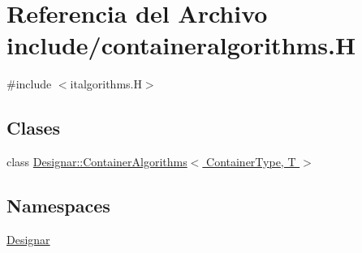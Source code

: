 \hypertarget{containeralgorithms_8_h}{}\section{Referencia del Archivo include/containeralgorithms.H}
\label{containeralgorithms_8_h}
{\ttfamily \#include $<$italgorithms.\+H$>$}\newline
\subsection*{Clases}
\begin{DoxyCompactItemize}
\item 
class \hyperlink{class_designar_1_1_container_algorithms}{Designar\+::\+Container\+Algorithms$<$ Container\+Type, T $>$}
\end{DoxyCompactItemize}
\subsection*{Namespaces}
\begin{DoxyCompactItemize}
\item 
 \hyperlink{namespace_designar}{Designar}
\end{DoxyCompactItemize}
